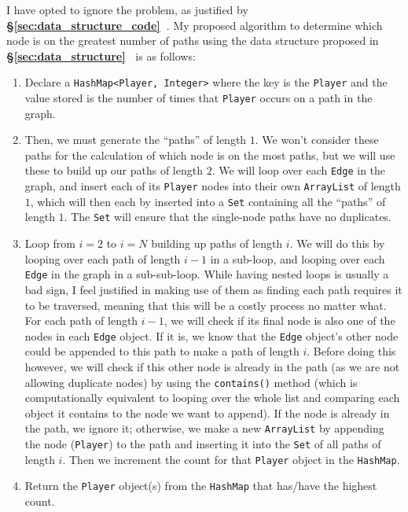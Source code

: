 \documentclass[a4paper,11pt]{article}
\newcommand{\secref}[1]{\textbf{§\ref{#1}~\nameref{#1}}}
\begin{document}
I have opted to ignore the problem, as justified by \secref{sec:data_structure_code}.
My proposed algorithm to determine which node is on the greatest number of paths using the data structure proposed in \secref{sec:data_structure} is as
follows:
\begin{enumerate}
    \item   Declare a \texttt{HashMap<Player, Integer>} where the key is the \texttt{Player} and the value stored is the number of times that \texttt{Player} occurs on
            a path in the graph.

    \item   Then, we must generate the ``paths'' of length $1$.
            We won't consider these paths for the calculation of which node is on the most paths, but we will use these to build up our paths of length $2$.
            We will loop over each \texttt{Edge} in the graph, and insert each of its \texttt{Player} nodes into their own \texttt{ArrayList} of length $1$,
            which will then each by inserted into a \texttt{Set} containing all the ``paths'' of length $1$.
            The \texttt{Set} will ensure that the single-node paths have no duplicates.

    \item   Loop from $i=2$ to $i=N$ building up paths of length $i$.
            We will do this by looping over each path of length $i-1$ in a sub-loop, and looping over each \texttt{Edge} in the graph in a sub-sub-loop.
            While having nested loops is usually a bad sign, I feel justified in making use of them as finding each path requires it to be traversed, meaning that this will be a costly
            process no matter what.
            For each path of length $i-1$, we will check if its final node is also one of the nodes in each \texttt{Edge} object. 
            If it is, we know that the \texttt{Edge} object's other node could be appended to this path to make a path of length $i$. 
            Before doing this however, we will check if this other node is already in the path (as we are not allowing duplicate nodes) by using the \texttt{contains()} method 
            (which is computationally equivalent to looping over the whole list and comparing each object it contains to the node we want to append).
            If the node is already in the path, we ignore it; otherwise, we make a new \texttt{ArrayList} by appending the node (\texttt{Player}) to the path and inserting 
            it into the \texttt{Set} of all paths of length $i$.
            Then we increment the count for that \texttt{Player} object in the \texttt{HashMap}.

    \item   Return the \texttt{Player} object(s) from the \texttt{HashMap} that has/have the highest count.
\end{enumerate}
\end{document}
